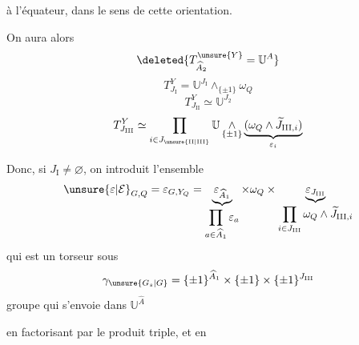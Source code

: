 à l'équateur, dans le sens de cette orientation.

On aura alors
\[
\deleted{T_{\widehat A_2}^{\unsure{Y}}=\mathbb U^A}
\]
\[
T_{J_{\mathrm I}}^Y=\mathbb U^{J_{\mathrm I}}\mathop{\wedge}_{\{\pm1\}}\omega_Q
\]
\[
T_{J_{\mathrm {II}}}^Y\simeq\mathbb U^{J_2}
\]
\[
T_{J_{\mathrm{III}}}^Y\simeq
\prod_{i\in J_{\unsure{\mathrm{II}|\mathrm{III}}}}
\mathbb U\mathop{\wedge}_{\{\pm1\}}
\underbrace{(\omega_Q\wedge\widetilde J_{\mathrm{III},i})}_{\varepsilon_i}
\]

Donc, si $J_{\mathrm I}\ne\varnothing$, on introduit l'ensemble
\[
\unsure{\varepsilon|\mathcal E}_{G,Q}=\varepsilon_{G,Y_Q}
=\underbrace{\varepsilon_{\widehat A_1}}_{\displaystyle\prod_{a\in\widehat A_1}\varepsilon_a}
\times\omega_Q\times
\underbrace{\varepsilon_{J_{\mathrm{III}}}}_{\displaystyle\prod_{i\in J_{\mathrm{III}}}\omega_Q\wedge\widetilde J_{\mathrm{III},i}}
\]
qui est un torseur sous
\[
\gamma_{\unsure{G_s|G}}=\{\pm1\}^{\widehat A_1}\times\{\pm1\}\times\{\pm1\}^{J_{\mathrm{III}}}
\]
groupe qui s'envoie dans $\mathbb U^{\widehat A}$

en factorisant par le produit triple, et en

